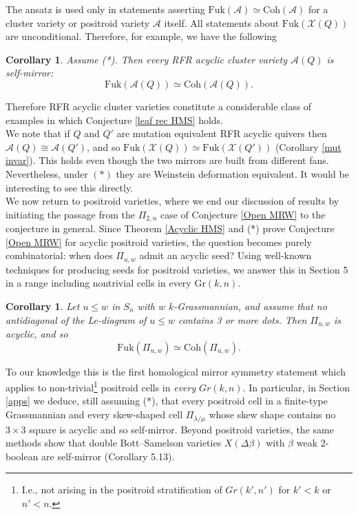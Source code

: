 \documentclass[11pt]{amsart}
\newtheorem{cor}[thm]{Corollary}
\theoremstyle{definition}
\theoremstyle{remark}
\newcommand{\Coh}{\mathrm{Coh}}
\newcommand{\Fuk}{\mathrm{Fuk}}
\numberwithin{equation}{section}
\begin{document}
The ansatz is used only in statements asserting $\Fuk(\mathcal{A}) \simeq \Coh(\mathcal{A})$ for a cluster variety or positroid variety $\mathcal{A}$ itself. All statements about $\Fuk(\mathcal{X}(Q))$ are unconditional. Therefore, for example, we have the following

\begin{cor}\label{RFR Self HMS}
    Assume (*). Then every RFR acyclic cluster variety $\mathcal{A}(Q)$ is self-mirror: $$\Fuk(\mathcal{A}(Q)) \simeq \Coh(\mathcal{A}(Q)).$$
\end{cor}

Therefore RFR acyclic cluster varieties constitute a considerable class of examples in which Conjecture \ref{leaf rec HMS} holds.\\

We note that if $Q$ and $Q'$ are mutation equivalent RFR acyclic quivers then $\mathcal{A}(Q) \cong \mathcal{A}(Q')$, and so $\Fuk(\mathcal{X}(Q)) \simeq \Fuk(\mathcal{X}(Q'))$ (Corollary \ref{mut invar}). This holds even though the two mirrors are built from different fans. Nevertheless, under $(*)$ they are Weinstein deformation equivalent. It would be interesting to see this directly.\\

We now return to positroid varieties, where we end our discussion of results by initiating the passage from the $\Pi_{2,n}$ case of Conjecture \ref{Open MRW} to the conjecture in general. Since Theorem \ref{Acyclic HMS} and (*) prove Conjecture \ref{Open MRW} for acyclic positroid varieties, the question becomes purely combinatorial: when does $\Pi_{u,w}$ admit an acyclic seed? Using well-known techniques for producing seeds for positroid varieties, we answer this in Section 5 in a range including nontrivial cells in every $\mathrm{Gr}(k,n)$.

\begin{cor}\label{Squareless HMS} Let $u \leq w$ in $S_n$ with $w$ $k$-Grassmannian, and assume that no antidiagonal of the Le-diagram of $u \leq w$ contains 3 or more dots. Then $\Pi_{u,w}$ is acyclic, and so $$\Fuk(\Pi_{u,w}) \simeq \Coh(\Pi_{u,w}).$$
\end{cor}

To our knowledge this is the first homological mirror symmetry statement which applies to non-trivial\footnote{I.e., not arising in the positroid stratification of $Gr(k',n')$ for $k' < k$ or $n' < n$.} positroid cells in \textit{every} $Gr(k,n)$. In particular, in Section \ref{apps} we deduce, still assuming (*), that every positroid cell in a finite-type Grassmannian and every skew-shaped cell $\Pi_{\lambda/\mu}$ whose skew shape contains no $3 \times 3$ square is acyclic and so self-mirror. Beyond positroid varieties, the same methods show that double Bott–Samelson varieties $X(\Delta\beta)$ with $\beta$ weak 2-boolean are self-mirror (Corollary 5.13).
\\
\end{document}

